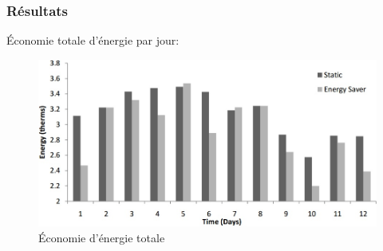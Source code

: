 \begin{frame}
 \frametitle{Résultats}
 Économie totale d'énergie par jour:
 \begin{figure}
  \centering
  \includegraphics[scale=0.38]{figures/energysaver.jpg}
  \caption{Économie d'énergie totale}
 \end{figure} 
\end{frame}

 
 
